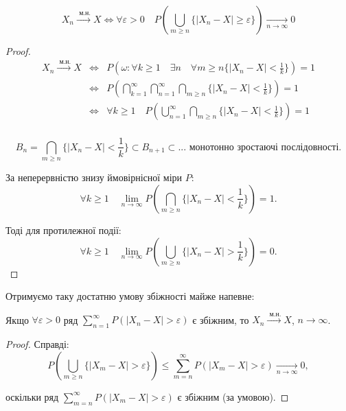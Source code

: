 \begin{theorem}
     $$X_n \xrightarrow{\text{ м.н.}} X
     \Leftrightarrow \forall \varepsilon > 0 
        \quad P(\bigcup\limits_{m \geqslant n} \{|X_n - X| \geqslant \varepsilon\})
            \xrightarrow[n \rightarrow \infty]{} 0$$
\end{theorem}
\begin{proof}
    $$\begin{array}{rcl}
        X_n \xrightarrow{\text{ м.н.}} X & \Leftrightarrow & 
            P(\omega: \forall k \geqslant 1 \quad \exists n \quad \forall m \geqslant n
                \{|X_n - X| < \frac{1}{k}\}) = 1\\
        & \Leftrightarrow & 
            P(\bigcap\limits_{k=1}^{\infty} \bigcap\limits_{n=1}^{\infty} \bigcap\limits_{m \geqslant n}
                \{|X_n - X| < \frac{1}{k}\}) = 1\\
        & \Leftrightarrow & \forall k \geqslant 1 \quad
            P(\bigcup\limits_{n=1}^{\infty}\bigcap\limits_{m \geqslant n}
                \{|X_n - X| < \frac{1}{k}\}) = 1\\
    \end{array}$$

    $$B_n = \bigcap\limits_{m \geqslant n} \{|X_n - X| < \frac{1}{k}\}
        \subset B_{n+1} \subset ... \text{ монотонно зростаючі послідовності.}$$
    
     За неперервністю знизу ймовірнісної міри $P$:
     $$\forall k \geqslant 1 \quad \lim\limits_{n \rightarrow \infty}
        P(\bigcap\limits_{m \geqslant n} \{|X_n - X| < \frac{1}{k}\}) = 1.$$
    
    Тоді для протилежної події:
    $$\forall k \geqslant 1 \quad \lim\limits_{n \rightarrow \infty}
        P(\bigcup\limits_{m \geqslant n} \{|X_n - X| > \frac{1}{k}\}) = 0.$$
\end{proof}

Отримуємо таку достатню умову збіжності
майже напевне:

\begin{theorem}
    Якщо $\forall \varepsilon > 0$ ряд
    $\sum\limits_{n=1}^{\infty} P(|X_n - X| > \varepsilon)$ є
    збіжним, то $X_n \xrightarrow{\text{ м.н.}} X$, $n \rightarrow \infty$.
\end{theorem}
\begin{proof}
    Справді:
    $$P(\bigcup\limits_{m \geqslant n} \{|X_m - X| > \varepsilon\})
    \leqslant \sum\limits_{m = n}^{\infty} P(|X_m - X| > \varepsilon)
        \xrightarrow[n \rightarrow \infty]{} 0,$$
    
    оскільки ряд $\sum\limits_{m = n}^{\infty} P(|X_m - X| > \varepsilon)$
    є збіжним (за умовою).
\end{proof}

